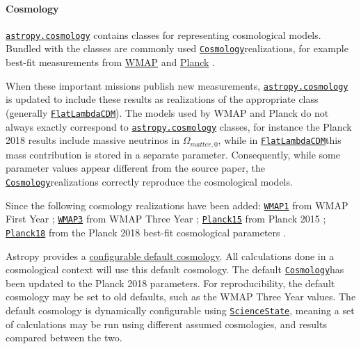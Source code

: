 \documentclass[modern]{aastex631}
\newcommand{\astropysubpkg}[1]{\href{http://docs.astropy.org/en/stable/#1/index.html}{\texttt{astropy.#1}}\xspace}
\newcommand{\astropycosmology}{\astropysubpkg{cosmology}}
\newcommand{\astropyapi}[2]{\href{https://docs.astropy.org/en/stable/api/astropy.#1.html}{#2}}
\newcommand{\astropyapidoc}[2]{\astropyapi{#1}{\texttt{#2}\xspace}}
\newcommand{\astropyCosmology}{\astropyapidoc{cosmology.Cosmology}{Cosmology}}
\newcommand{\astropyFlatLambdaCDM}{\astropyapidoc{cosmology.FlatLambdaCDM}{FlatLambdaCDM}}
\newcommand{\astropyScienceState}{\astropyapidoc{utils.state.ScienceState}{ScienceState}}
\begin{document}
  \paragraph{Cosmology}

    \astropycosmology contains classes for representing cosmological models.
    Bundled with the classes are commonly used \astropyCosmology realizations, for
    example best-fit measurements from
    \href{https://lambda.gsfc.nasa.gov/product/map/current/}{WMAP}
    \citep{WMAP2003} and \href{https://www.nasa.gov/mission_pages/planck}{Planck}
    \citep{PlanckMission:2006}.

    When these important missions publish new measurements, \astropycosmology is
    updated to include these results as realizations of the appropriate class
    (generally \astropyFlatLambdaCDM). The models used by WMAP and Planck do not
    always exactly correspond to \astropycosmology classes, for instance the
    Planck 2018 results \citep{Planck2018VI} include massive neutrinos in
    $\Omega_{matter,0}$, while in \astropyFlatLambdaCDM this mass contribution is
    stored in a separate parameter. Consequently, while some parameter values
    appear different from the source paper, the \astropyCosmology realizations
    correctly reproduce the cosmological models.

    Since \citealt{astropy:2018} the following cosmology realizations have been
    added:
    \href{http://docs.astropy.org/en/stable/api/astropy.cosmology.WMAP1.html}{\texttt{WMAP1}}
    from WMAP First Year \citep[Table 7: WMAP + CBI + ACBAR + 2dFGRS +
    Lya]{WMAP1Year:2003};
    \href{http://docs.astropy.org/en/stable/api/astropy.cosmology.WMAP3.html}{\texttt{WMAP3}}
    from WMAP Three Year \citep[Table 6: WMAP + SNGold]{WMAP3Year:2007};
    \href{http://docs.astropy.org/en/stable/api/astropy.cosmology.Planck15.html}{\texttt{Planck15}}
    from Planck 2015 \citep[Table 4: TT, TE, EE + lowP + lensing +
    ext]{Planck2015XIII:2016};
    \href{http://docs.astropy.org/en/stable/api/astropy.cosmology.Planck18.html}{\texttt{Planck18}}
    from the Planck 2018 best-fit cosmological parameters \citep[Table 2: TT, TE,
    EE + lowE + lensing + BAO]{Planck2018VI:2020}.

    Astropy provides a
    \href{http://docs.astropy.org/en/stable/api/astropy.cosmology.default_cosmology.html}{configurable
    default cosmology}. All calculations done in a cosmological context will use
    this default cosmology. The default \astropyCosmology has been updated to the
    Planck 2018 parameters. For reproducibility, the default cosmology may be set
    to old defaults, such as the WMAP Three Year values. The default cosmology is
    dynamically configurable using \astropyScienceState, meaning a set of
    calculations may be run using different assumed cosmologies, and results
    compared between the two.
\end{document}
